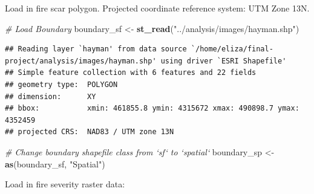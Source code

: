 \documentclass[]{article}
\newenvironment{Shaded}{\begin{snugshade}}{\end{snugshade}}
\newcommand{\CommentTok}[1]{\textcolor[rgb]{0.56,0.35,0.01}{\textit{#1}}}
\newcommand{\KeywordTok}[1]{\textcolor[rgb]{0.13,0.29,0.53}{\textbf{#1}}}
\newcommand{\NormalTok}[1]{#1}
\newcommand{\StringTok}[1]{\textcolor[rgb]{0.31,0.60,0.02}{#1}}
\begin{document}
Load in fire scar polygon. Projected coordinate reference system: UTM
Zone 13N.

\begin{Shaded}
\begin{Highlighting}[]
\CommentTok{# Load Boundary}
\NormalTok{boundary_sf <-}\StringTok{ }\KeywordTok{st_read}\NormalTok{(}\StringTok{"../analysis/images/hayman.shp"}\NormalTok{)}
\end{Highlighting}
\end{Shaded}

\begin{verbatim}
## Reading layer `hayman' from data source `/home/eliza/final-project/analysis/images/hayman.shp' using driver `ESRI Shapefile'
## Simple feature collection with 6 features and 22 fields
## geometry type:  POLYGON
## dimension:      XY
## bbox:           xmin: 461855.8 ymin: 4315672 xmax: 490898.7 ymax: 4352459
## projected CRS:  NAD83 / UTM zone 13N
\end{verbatim}

\begin{Shaded}
\begin{Highlighting}[]
\CommentTok{# Change boundary shapefile class from `sf` to `spatial`}
\NormalTok{boundary_sp <-}\StringTok{ }\KeywordTok{as}\NormalTok{(boundary_sf, }\StringTok{"Spatial"}\NormalTok{)}
\end{Highlighting}
\end{Shaded}

Load in fire severity raster data:
\end{document}
